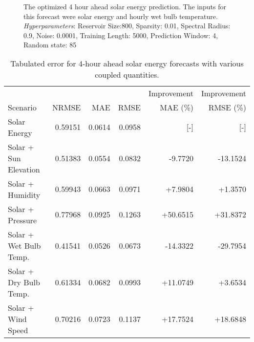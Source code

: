 \begin{figure*}[ht]
  \centering
  
  \caption{The optimized 4 hour ahead solar energy prediction. The inputs for this forecast were solar energy and hourly wet bulb temperature. \textit{Hyperparameters}: Reservoir Size:800, Sparsity: 0.01, Spectral Radius: 0.9, Noise: 0.0001, Training Length: 5000, Prediction Window: 4, Random state: 85}
  \label{fig:solar04}
\end{figure*}
  \begin{table*}[h]
    \centering
    \caption{Tabulated error for 4-hour ahead solar energy forecasts with various coupled quantities.}
    \label{tab:solar04}
    \begin{tabular}{lrrrrr}
      \hline
      & & & & Improvement & Improvement \\
      Scenario & NRMSE & MAE & RMSE & MAE (\%) & RMSE (\%)\\
      \hline
      Solar Energy & 0.59151 & 0.0614 & 0.0958 & [-] & [-] \\
      Solar + Sun Elevation & 0.51383 & 0.0554 &  0.0832 & -9.7720 & -13.1524 \\
      Solar + Humidity & 0.59943 & 0.0663 & 0.0971 & +7.9804 & +1.3570 \\
      Solar + Pressure & 0.77968 & 0.0925  & 0.1263 & +50.6515 & +31.8372 \\
      Solar + Wet Bulb Temp. & 0.41541 & 0.0526 & 0.0673 & -14.3322 & -29.7954 \\
      Solar + Dry Bulb Temp. & 0.61334 & 0.0682 & 0.0993 & +11.0749 & +3.6534 \\
      Solar + Wind Speed & 0.70216 & 0.0723 & 0.1137 & +17.7524 & +18.6848 \\
      \hline
    \end{tabular}
  \end{table*}
\FloatBarrier
